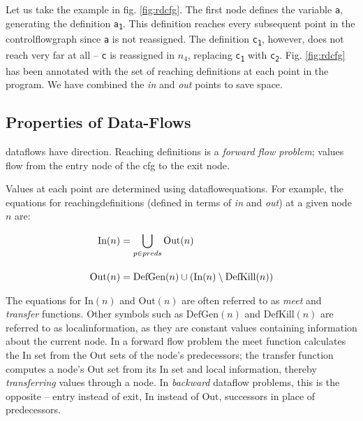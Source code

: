 \documentclass[bsc,twoside,singlespacing,parskip,logo,notimes,normalheadings]{infthesis}
\begin{document}
        Let us take the example in fig. \ref{fig:rdcfg}. The first
        node defines the variable {\tt a}, generating the definition
        {\tt a\textsubscript{1}}. This definition reaches every \break
        subsequent point in the \gls{controlflowgraph} since {\tt a}
        is not reassigned. The definition {\tt c\textsubscript{1}},
        however, does not reach very far at all -- {\tt c} is
        reassigned in $n_4$, replacing {\tt c\textsubscript{1}} with
        {\tt c\textsubscript{2}}. Fig. \ref{fig:rdcfg} has been
        annotated with the set of reaching definitions at each point
        in the program. We have combined the {\em in} and {\em out}
        points to save space.
                
        \subsection{Properties of Data-Flows}

        \Gls{dataflow}s have \gls{direction}. Reaching definitions is
        a {\em forward flow problem}; values flow from the entry node
        of the \gls{cfg} to the exit node.

        Values at each point are determined using
        \gls{dataflowequations}. For example, the equations for
        \gls{reachingdefinition}s (defined in terms of {\em in} and
        {\em out}) at a given node $n$ are:
        
        \vspace{-7mm}
        \begin{align*}
          \textnormal{In}(n)  & = \bigcup_{p \in preds} \textnormal{Out}(n) \\[1em]
          \textnormal{Out}(n) & = \textnormal{DefGen}(n) \cup (\textnormal{In}(n) \setminus \textnormal{DefKill}(n))
        \end{align*}
        
        The equations for $\text{In}(n)$ and $\text{Out}(n)$ are often
        referred to as {\em \gls{meet}} and {\em \gls{transfer}}
        functions. Other symbols such as $\text{DefGen}(n)$ and
        $\text{DefKill}(n)$ are referred to as \gls{localinformation},
        as they are constant values containing information about the
        current node. In a forward flow problem the meet function
        calculates the In set from the Out sets of the node's
        predecessors; the \gls{transfer} function computes a node's
        Out set from its In set and local information, thereby {\em
          transferring} values through a node. In {\em backward}
        \gls{dataflow} problems, this is the opposite -- entry instead
        of exit, In instead of Out, successors in place of
        predecessors.
\end{document}
